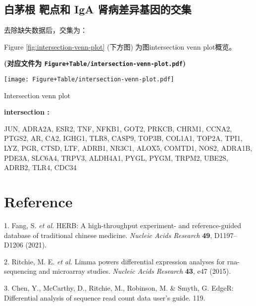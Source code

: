 \documentclass[
]{article}
\newenvironment{cslreferences}%
  {}%
  {\par}
\begin{document}
\hypertarget{ux767dux8305ux6839-ux9776ux70b9ux548c-iga-ux80beux75c5ux5deeux5f02ux57faux56e0ux7684ux4ea4ux96c6}{%
\subsection{白茅根 靶点和 IgA 肾病差异基因的交集}\label{ux767dux8305ux6839-ux9776ux70b9ux548c-iga-ux80beux75c5ux5deeux5f02ux57faux56e0ux7684ux4ea4ux96c6}}

去除缺失数据后，交集为：

Figure \ref{fig:intersection-venn-plot} (下方图) 为图intersection venn plot概览。

\textbf{(对应文件为 \texttt{Figure+Table/intersection-venn-plot.pdf})}

\def\@captype{figure}
\begin{center}
\texttt{[image: Figure+Table/intersection-venn-plot.pdf]}
\caption{Intersection venn plot}\label{fig:intersection-venn-plot}
\end{center}

\begin{center}\begin{tcolorbox}[colback=gray!10, colframe=gray!50, width=0.9\linewidth, arc=1mm, boxrule=0.5pt]
\textbf{
intersection
:}

\vspace{0.5em}

    JUN, ADRA2A, ESR2, TNF, NFKB1, GOT2, PRKCB, CHRM1,
CCNA2, PTGS2, AR, CA2, IGHG1, TLR8, CASP9, TOP3B, COL1A1,
TOP2A, TPI1, LYZ, PGR, CTSD, LTF, ADRB1, NR3C1, ALOX5,
COMTD1, NOS2, ADRA1B, PDE3A, SLC6A4, TRPV3, ALDH4A1, PYGL,
PYGM, TRPM2, UBE2S, ADRB2, TLR4, CDC34

\vspace{2em}
\end{tcolorbox}
\end{center}

\hypertarget{bibliography}{%
\section*{Reference}\label{bibliography}}

\hypertarget{refs}{}
\begin{cslreferences}
\leavevmode\hypertarget{ref-HerbAHighThFang2021}{}%
1. Fang, S. \emph{et al.} HERB: A high-throughput experiment- and reference-guided database of traditional chinese medicine. \emph{Nucleic Acids Research} \textbf{49}, D1197--D1206 (2021).

\leavevmode\hypertarget{ref-LimmaPowersDiRitchi2015}{}%
2. Ritchie, M. E. \emph{et al.} Limma powers differential expression analyses for rna-sequencing and microarray studies. \emph{Nucleic Acids Research} \textbf{43}, e47 (2015).

\leavevmode\hypertarget{ref-EdgerDifferenChen}{}%
3. Chen, Y., McCarthy, D., Ritchie, M., Robinson, M. \& Smyth, G. EdgeR: Differential analysis of sequence read count data user's guide. 119.
\end{cslreferences}
\end{document}

